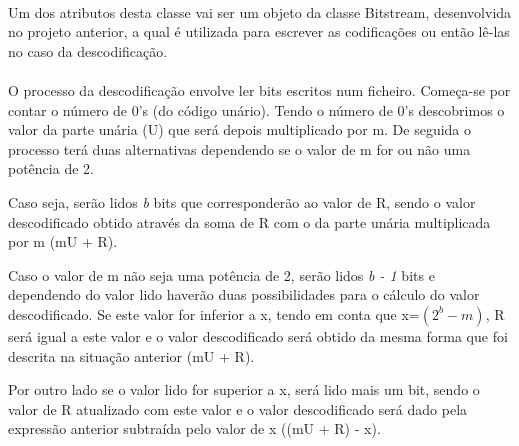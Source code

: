 \documentclass{report}
\begin{document}
\paragraph{}

Um dos atributos desta classe vai ser um objeto da classe Bitstream, desenvolvida no projeto anterior, a qual é utilizada para escrever as codificações ou então lê-las no caso da descodificação. 

\paragraph{}
O processo da descodificação envolve ler bits escritos num ficheiro. Começa-se por contar o número de 0's (do código unário). Tendo o número de 0's descobrimos o valor da parte unária (U) que será depois multiplicado por m.
De seguida o processo terá duas alternativas dependendo se o valor de m for ou não uma potência de 2.

Caso seja, serão lidos \textit{b} bits que corresponderão ao valor de R, sendo o valor descodificado obtido através da soma de R com o da parte unária multiplicada por m (mU + R).

Caso o valor de m não seja uma potência de 2, serão lidos \textit{b - 1} bits e dependendo do valor lido haverão duas possibilidades para o cálculo do valor descodificado. Se este valor for inferior a x, tendo em conta que x=\((2^b - m)\), R será igual a este valor e o valor descodificado será obtido da mesma forma que foi descrita na situação anterior (mU + R).

Por outro lado se o valor lido for superior a x, será lido mais um bit, sendo o valor de R atualizado com este valor e o valor descodificado será dado pela expressão anterior subtraída pelo valor de x ((mU + R) - x).

\paragraph{}
\end{document}
